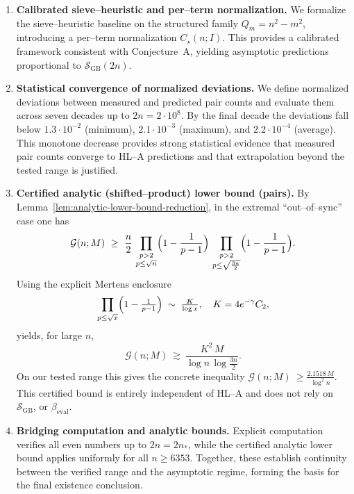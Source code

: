 \documentclass[11pt]{article}
\theoremstyle{inline}
\theoremstyle{break}
\theoremstyle{break}
\theoremstyle{break}
\theoremstyle{break}
\theoremstyle{break}
\theoremstyle{inline}
\newcommand{\xMertens}{6353} %
\newcommand{\xLambdaMinLimit}{1.3\cdot 10^{-2}} %
\newcommand{\xLambdaMaxLimit}{2.1\cdot 10^{-3}} %
\newcommand{\xLambdaAvgLimit}{2.2\cdot 10^{-4}} %
\newcommand{\SGB}{\mathcal{S}_{\scriptscriptstyle\mathrm{GB}}}
\newcommand{\betacal}{\beta_{\mathrm{eval}}}
\begin{document}
\begin{enumerate}\itemsep4pt

  \item \textbf{Calibrated sieve–heuristic and per–term normalization.}
  We formalize the sieve–heuristic baseline on the structured family
  \(Q_m = n^2 - m^2\), introducing a per–term normalization \(C_\star(n;I)\).
  This provides a calibrated framework consistent with Conjecture~A,
  yielding asymptotic predictions proportional to \(\SGB(2n)\).

 \item \textbf{Statistical convergence of normalized deviations.}
  We define normalized deviations between measured and predicted pair counts
  and evaluate them across seven decades up to \(2n = 2\cdot 10^8\).
  By the final decade the deviations fall below
  \(\xLambdaMinLimit\) (minimum), \(\xLambdaMaxLimit\) (maximum),
  and \(\xLambdaAvgLimit\) (average).
  This monotone decrease provides strong statistical evidence that measured
   pair counts converge to HL–A predictions and that extrapolation beyond the
  tested range is justified.

\item \textbf{Certified analytic (shifted–product) lower bound (pairs).}
  By Lemma~\ref{lem:analytic-lower-bound-reduction}, in the extremal
  “out–of–sync” case one has
  \begin{equation}
    \mathcal{G}(n;M)\ \ge\ \frac{n}{2}\,
    \prod_{\substack{p>2\\ p\le \sqrt{n}}}\Bigl(1-\frac{1}{p-1}\Bigr)\,
    \prod_{\substack{p>2\\ p\le \sqrt{\frac{3n}{2}}}}\Bigl(1-\frac{1}{p-1}\Bigr).
  \end{equation}
  Using the explicit Mertens enclosure
  \cite{RosserSchoenfeld1962, Dusart2010, HardyLittlewood1923, MontgomeryVaughan2007}
  \[
    \prod_{p\le \sqrt{x}}\Bigl(1-\tfrac{1}{p-1}\Bigr)
     \;\sim\; \tfrac{K}{\log x},\quad K=4e^{-\gamma}C_2,
  \]
  yields, for large \(n\),
  \begin{equation}
    \mathcal{G}(n;M)\ \gtrsim\ \frac{K^2\,M}{\log{n}\,\log{\frac{3n}{2}}}.
  \end{equation}
  On our tested range this gives the concrete inequality
  \(\mathcal{G}(n;M)\ \ge \tfrac{2.1518\,M}{\log^2{n}}\).
  This certified bound is entirely independent of HL–A and does not rely 
  on \( \SGB \), or \( \betacal \).

  \item \textbf{Bridging computation and analytic bounds.}
  Explicit computation verifies all even numbers up to \(2n = 2n_\ast\),
  while the certified analytic lower bound applies uniformly for
  all \(n \ge \xMertens\).
  Together, these establish continuity between the verified range
  and the asymptotic regime, forming the basis for the final
  existence conclusion.
\end{enumerate}
\end{document}
